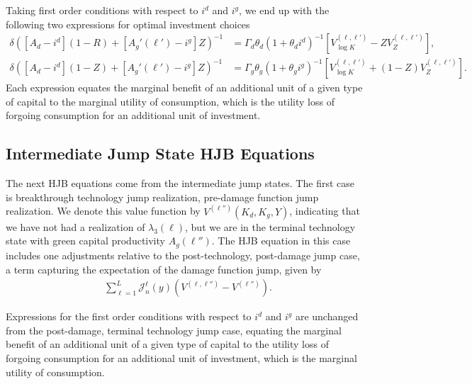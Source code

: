 \documentclass[12pt]{article}
\begin{document}
\begin{appendices}
Taking first order conditions with respect to $i^d$ and $i^g$, we end up with the following two expressions for optimal investment choices
\begin{align*}
\delta([A_{d}-i^{d}](1-R)+[A_{g}'(\ell')-i^{g}]Z)^{-1}	& = \Gamma_{d}\theta_{d}(1+\theta_{d}i^{d})^{-1}[V^{(\ell,\ell')}_{\log K}-Z V^{(\ell,\ell')}_{Z}], \\
\delta([A_{d}-i^{d}](1-Z)+[A_{g}'(\ell')-i^{g}]Z)^{-1}	 & = \Gamma_{g}\theta_{g}(1+\theta_{g}i^{g})^{-1}[V^{(\ell,\ell')}_{\log K}+(1-Z)V^{(\ell,\ell')}_{Z}]. 
\end{align*}
Each expression equates the marginal benefit of an additional unit of a given type of capital to the marginal utility of consumption, which is the utility loss of forgoing consumption for an additional unit of investment. 

\subsection{Intermediate Jump State HJB Equations}

The next HJB equations come from the intermediate jump states. The first case is breakthrough technology jump realization, pre-damage function jump realization. We denote this value function by $V^{(\ell'')}(K_{d}, K_{g}, Y)$, indicating that we have not had a realization of $\lambda_3(\ell)$, but we are in the terminal technology state with green capital productivity $A_g(\ell'')$. The HJB equation in this case includes one adjustments relative to the post-technology, post-damage jump case, a term capturing the expectation of the damage function jump, given by 
\begin{equation*}
\begin{split}
  & \sum_{\ell=1}^{L} \mathcal{J}^{\ell}_n(y) (V^{(\ell,\ell'')} - V^{(\ell'')}).
\end{split}
\end{equation*}

Expressions for the first order conditions with respect to $i^d$ and $i^g$ are unchanged from the post-damage, terminal technology jump case, equating the marginal benefit of an additional unit of a given type of capital to the utility loss of forgoing consumption for an additional unit of investment, which is the marginal utility of consumption. 



\end{appendices}
\end{document}
